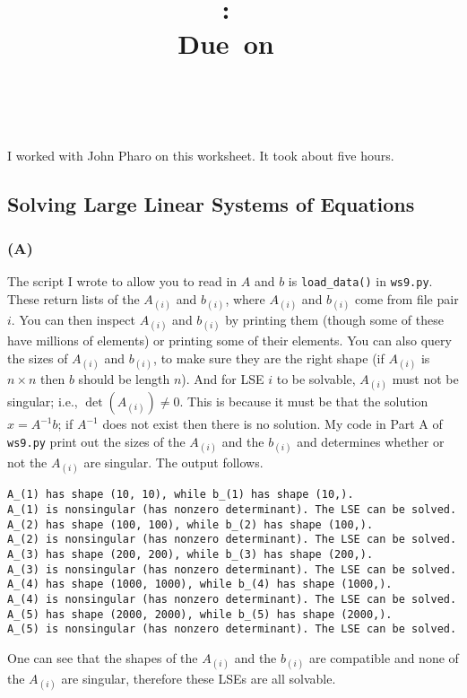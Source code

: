 \documentclass{article}
\title{\vspace{2in}\textmd{\textbf{\hmwkClass:\ \hmwkTitle}}\\\normalsize\vspace{0.1in}\small{Due\ on\ \hmwkDueDate}\\\vspace{0.1in}\large{\textit{\hmwkClassInstructor\ \hmwkClassTime}}\vspace{3in}}
\date{}
\author{\textbf{\hmwkAuthorName}}
\begin{document}
\begin{spacing}{1.1}

\newpage


I worked with John Pharo on this worksheet. It took about five hours.

\subsection{Solving Large Linear Systems of Equations}

\subsubsection{(A)} The script I wrote to allow you to read in \(A\) and \(b\) is \texttt{load\_data()} in \texttt{ws9.py}. These return lists of the \(A_{(i)}\) and \(b_{(i)}\), where \(A_{(i)}\) and \(b_{(i)}\) come from file pair \(i\). You can then inspect \(A_{(i)}\) and \(b_{(i)}\) by printing them (though some of these have millions of elements) or printing some of their elements. You can also query the sizes of \(A_{(i)}\) and \(b_{(i)}\), to make sure they are the right shape (if \(A_{(i)}\) is \(n \times n\) then \(b\) should be length \(n\)). And for LSE \(i\) to be solvable, \(A_{(i)}\) must not be singular; i.e., \(\det(A_{(i)}) \neq 0\). This is because it must be that the solution \(x = A^{-1}b\); if \(A^{-1}\) does not exist then there is no solution. My code in Part A of \texttt{ws9.py} print out the sizes of the \(A_{(i)}\) and the \(b_{(i)}\) and determines whether or not the \(A_{(i)}\) are singular. The output follows.
\begin{verbatim}
A_(1) has shape (10, 10), while b_(1) has shape (10,).
A_(1) is nonsingular (has nonzero determinant). The LSE can be solved.
A_(2) has shape (100, 100), while b_(2) has shape (100,).
A_(2) is nonsingular (has nonzero determinant). The LSE can be solved.
A_(3) has shape (200, 200), while b_(3) has shape (200,).
A_(3) is nonsingular (has nonzero determinant). The LSE can be solved.
A_(4) has shape (1000, 1000), while b_(4) has shape (1000,).
A_(4) is nonsingular (has nonzero determinant). The LSE can be solved.
A_(5) has shape (2000, 2000), while b_(5) has shape (2000,).
A_(5) is nonsingular (has nonzero determinant). The LSE can be solved.
\end{verbatim}
One can see that the shapes of the \(A_{(i)}\) and the \(b_{(i)}\) are compatible and none of the \(A_{(i)}\) are singular, therefore these LSEs are all solvable.
\\


\end{spacing}
\end{document}
